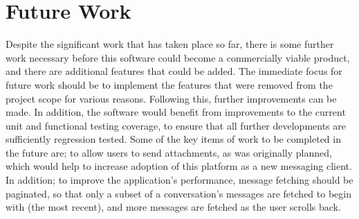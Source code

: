 \section{Future Work}
Despite the significant work that has taken place so far, there is some further work necessary before this software could become a commercially viable product, and there are additional features that could be added. The immediate focus for future work should be to implement the features that were removed from the project scope for various reasons. Following this, further improvements can be made. In addition, the software would benefit from improvements to the current unit and functional testing coverage, to ensure that all further developments are sufficiently regression tested. Some of the key items of work to be completed in the future are; to allow users to send attachments, as was originally planned, which would help to increase adoption of this platform as a new messaging client. In addition; to improve the application's performance, message fetching should be paginated, so that only a subset of a conversation's messages are fetched to begin with (the most recent), and more messages are fetched as the user scrolls back.
